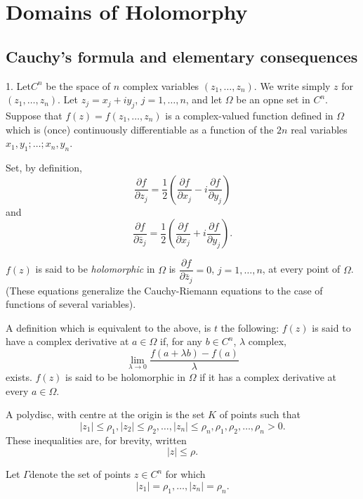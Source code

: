

\part{Domains of Holomorphy}\label{part1}

\chapter{Cauchy's formula and elementary consequences}\label{chap1}

1. Let\pageoriginale $C^n$ be the space of $n$ complex variables
$(z_1,\ldots, z_n)$. We write simply $z$ for $(z_1, \ldots, z_n)$. Let
$z_j = x_j + iy_j$, $j=1,\ldots, n$, and let $\Omega$ be an opne set
in $C^n$. Suppose that $f(z) = f(z_1, \ldots, z_n)$ is a complex-valued
function defined in $\Omega$ which is (once) continuously
differentiable as a function of the $2n$ real variables $x_1 , y_1;
\ldots ; x_n, y_n$. 
 
Set, by definition,
$$
\frac{\partial f}{\partial z_j} = \frac{1}{2} \left(\frac{\partial
  f}{\partial x_j} - i \frac{\partial f}{\partial y_j} \right)
$$
and
$$
\frac{\partial f}{\partial \bar{z}_j} = \frac{1}{2} \left(\frac{\partial
  f}{\partial x_j} + i \frac{\partial f}{\partial y_j} \right). 
$$

\begin{defi*}
$f(z)$ is said to be \textit{holomorphic} in $\Omega$ is
  $\dfrac{\partial f}{\partial \bar{z}_j} = 0$, $j=1,\ldots , n$, at
  every point of $\Omega$. (These equations generalize the
  Cauchy-Riemann equations to the case of functions of several
  variables). 
\end{defi*}

A definition which is equivalent to the above, is $t$ the following:
$f(z)$ is said to have a complex derivative at $a \in\Omega$ if, for
any $b \in C^n$, $\lambda$ complex, 
$$
\lim\limits_{\lambda \to 0} \frac{f(a+\lambda b) - f(a)}{\lambda}
$$
exists. $f(z)$ is said to be holomorphic in $\Omega$ if it has a
complex derivative at every $a\in\Omega$.

\begin{defi*}
A polydisc, with centre at the origin is the set $K$ of points such
that 
$$
|z_1| \leq \rho_1, |z_2| \leq \rho_2, \ldots, |z_n| \leq \rho_n,
\rho_1, \rho_2, \ldots, \rho_n > 0. 
$$
These inequalities are, for brevity, written
$$
|z| \leq \rho.
$$
\end{defi*}

Let $\Gamma$\pageoriginale denote the set of points $z\in C^n$ for
which
$$
|z_1| = \rho_1, \ldots, |z_n| = \rho_n.
$$

